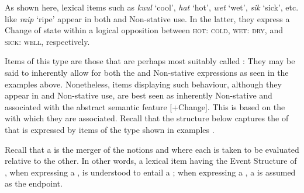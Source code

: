 
\z
\z

As shown here, lexical items such as \textit{kuul} `cool', \textit{hat} `hot', \textit{wet} `wet', \textit{sik} `sick', etc. like \textit{raip} `ripe' appear in both  and Non-stative use. In the latter, they express a Change of state within a logical opposition between \textsc{hot: cold}, \textsc{wet: dry}, and \textsc{sick: well}, respectively. 

Items of this type are those that are perhaps most suitably called : They may be said to inherently allow for both the  and Non-stative expressions as seen in the examples above. Nonetheless, items displaying such behaviour, although they appear in  and Non-stative use, are best seen as inherently Non-stative and associated with the abstract semantic feature [+Change]. This is based on the  with which they are associated. Recall that the structure below captures the  of  that is expressed by items of the type shown in examples . 

Recall that a  is the merger of the notions  and  where each is taken to be evaluated relative to the other. In other words, a lexical item having the Event Structure of , when expressing a , is understood to entail a ; when expressing a , a  is assumed as the endpoint. 

